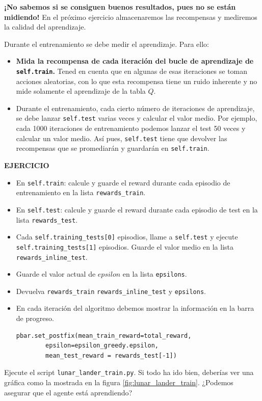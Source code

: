 \documentclass{article}
\begin{document}
\textbf{¡No sabemos si se consiguen buenos resultados, pues no se están midiendo!} En el próximo ejercicio almacenaremos las recompensas y mediremos la calidad del aprendizaje.


\begin{exercise}[breakable]
Durante el entrenamiento se debe medir el aprendizaje. Para ello:
\begin{itemize}
	\item \textbf{Mida la recompensa de cada iteración del bucle de aprendizaje de \texttt{self.train}.} Tened en cuenta que en algunas de esas iteraciones se toman acciones aleatorias, con lo que esta recompensa tiene un ruido inherente y no mide solamente el aprendizaje de la tabla $Q$.
	\item Durante el entrenamiento, cada cierto número de iteraciones de aprendizaje, se debe lanzar \texttt{self.test} varias veces y calcular el valor medio. Por ejemplo, cada 1000 iteraciones de entrenamiento podemos lanzar el test 50 veces y calcular un valor medio.	Así pues, \texttt{self.test} tiene que devolver las recompensas que se promediarán y guardarán en \texttt{self.train}.
\end{itemize}
\textbf{EJERCICIO}
\begin{itemize}
	\item En \texttt{self.train}: calcule y guarde el reward durante cada episodio de entrenamiento en la lista \texttt{rewards\_train}.
	\item En \texttt{self.test}: calcule y guarde el reward durante cada episodio de test en la lista \texttt{rewards\_test}.
	\item Cada \texttt{self.training\_tests[0]} episodios, llame a \texttt{self.test} y ejecute \texttt{self.training\_tests[1]} episodios. Guarde el valor medio en la lista \texttt{rewards\_inline\_test}.
	\item Guarde el valor actual de $epsilon$ en la lista \texttt{epsilons}.
	\item Devuelva \texttt{rewards\_train} \texttt{rewards\_inline\_test} y \texttt{epsilons}.
	\item En cada iteración del algoritmo debemos mostrar la información en la barra de progreso. 
\begin{verbatim}
pbar.set_postfix(mean_train_reward=total_reward, 
		epsilon=epsilon_greedy.epsilon, 
		mean_test_reward = rewards_test[-1])
\end{verbatim}
\end{itemize}
Ejecute el script \texttt{lunar\_lander\_train.py}. Si todo ha ido bien, deberías ver una gráfica como la mostrada en la figura \ref{fig:lunar_lander_train}. ¿Podemos asegurar que el agente está aprendiendo?
\end{exercise}
\end{document}
